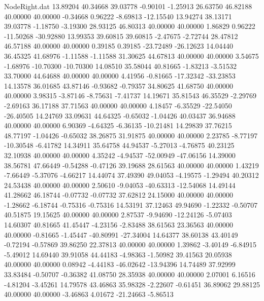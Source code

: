 \begin{filecontents}{NodeRight.dat}
  13.89204   40.34668   39.03778    -0.90101   -1.25913   26.63750   46.82188   40.00000   40.00000   -0.34668    0.96222   -8.69813  -12.15540
  13.94274   38.13171   39.03778    -1.18750   -3.19300   28.93125   46.80313   40.00000   40.00000    1.86829    0.96222  -11.50268  -30.92880
  13.99353   39.60815   39.60815    -2.47675   -2.72744   28.47812   46.57188   40.00000   40.00000    0.39185    0.39185  -23.72489  -26.12623
  14.04440   36.45325   41.68976    -1.11588   -1.11588   31.30625   44.67813   40.00000   40.00000    3.54675   -1.68976  -10.70300  -10.70300
  14.08510   35.58044   40.81665    -1.83213   -3.51532   33.70000   44.64688   40.00000   40.00000    4.41956   -0.81665  -17.32342  -33.23853
  14.13578   36.01685   43.87146    -0.93682   -0.79357   34.80625   41.68750   40.00000   40.00000    3.98315   -3.87146   -8.75631   -7.41737
  14.19671   35.81543   46.35529    -2.29769   -2.69163   36.17188   37.71563   40.00000   40.00000    4.18457   -6.35529  -22.54050  -26.40505
  14.24769   33.09631   44.64325    -0.65032   -1.04426   40.03437   36.94688   40.00000   40.00000    6.90369   -4.64325   -6.36135  -10.21481
  14.29839   37.76215   48.77197    -1.04426   -0.65032   38.26875   31.91875   40.00000   40.00000    2.23785   -8.77197  -10.30548   -6.41782
  14.34911   35.64758   44.94537    -5.27013   -4.76875   40.23125   32.10938   40.00000   40.00000    4.35242   -4.94537  -52.00949  -47.06156
  14.39000   38.56781   47.66449    -0.54288   -0.47126   39.19688   28.61563   40.00000   40.00000    1.43219   -7.66449   -5.37076   -4.66217
  14.44074   37.49390   49.04053    -4.19575   -1.29494   40.20312   24.53438   40.00000   40.00000    2.50610   -9.04053  -40.63313  -12.54068
  14.49144   41.28662   46.18744    -0.07732   -0.07732   37.62812   24.15000   40.00000   40.00000   -1.28662   -6.18744   -0.75316   -0.75316
  14.53191   37.12463   49.94690    -1.22332   -0.50707   40.51875   19.15625   40.00000   40.00000    2.87537   -9.94690  -12.24126   -5.07403
  14.60307   40.81665   41.45447    -4.23156   -2.83488   38.61563   23.36563   40.00000   40.00000   -0.81665   -1.45447  -40.80991  -27.34004
  14.64377   38.60138   43.40149    -0.72194   -0.57869   39.86250   22.37813   40.00000   40.00000    1.39862   -3.40149   -6.84915   -5.49012
  14.69440   39.91058   44.44183    -4.98363   -1.50982   39.41563   20.05938   40.00000   40.00000    0.08942   -4.44183  -46.02642  -13.94396
  14.74489   37.92999   33.83484    -0.50707   -0.36382   41.08750   28.35938   40.00000   40.00000    2.07001    6.16516   -4.81204   -3.45261
  14.79578   43.46863   35.98328    -2.22607   -0.61451   36.89062   29.88125   40.00000   40.00000   -3.46863    4.01672  -21.24663   -5.86513

\end{filecontents}
